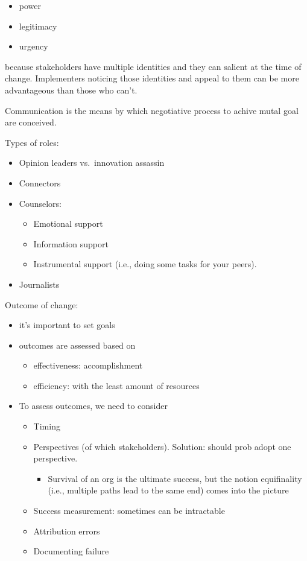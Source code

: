 \documentclass[
]{book}
\providecommand{\tightlist}{%
  \setlength{\itemsep}{0pt}\setlength{\parskip}{0pt}}
\begin{document}
\begin{itemize}
\tightlist
\item
  power
\item
  legitimacy
\item
  urgency
\end{itemize}

because stakeholders have multiple identities and they can salient at the time of change. Implementers noticing those
identities and appeal to them can be more advantageous than those who can't.

Communication is the means by which negotiative process to achive mutal goal are conceived. \citep{DEETZ_2001}

Types of roles:

\begin{itemize}
\item
  Opinion leaders vs.~innovation assassin
\item
  Connectors
\item
  Counselors:

  \begin{itemize}
  \item
    Emotional support
  \item
    Information support
  \item
    Instrumental support (i.e., doing some tasks for your peers).
  \end{itemize}
\item
  Journalists
\end{itemize}

Outcome of change:

\begin{itemize}
\item
  it's important to set goals
\item
  outcomes are assessed based on

  \begin{itemize}
  \item
    effectiveness: accomplishment
  \item
    efficiency: with the least amount of resources
  \end{itemize}
\item
  To assess outcomes, we need to consider

  \begin{itemize}
  \item
    Timing
  \item
    Perspectives (of which stakeholders). Solution: should prob adopt one perspective.

    \begin{itemize}
    \tightlist
    \item
      Survival of an org is the ultimate success, but the notion equifinality (i.e., multiple paths lead to the
      same end) comes into the picture
    \end{itemize}
  \item
    Success measurement: sometimes can be intractable
  \item
    Attribution errors
  \item
    Documenting failure
  \end{itemize}
\end{itemize}
\end{document}
